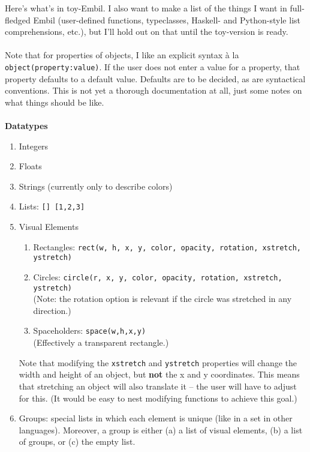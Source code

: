 \documentclass[12pt]{article}
\theoremstyle{remark}
\newcommand{\ttt}[1]{\texttt{#1}}
\begin{document}
\newpage 
\noindent
Here's what's in toy-Embil. I also want to make a list of the things I want in full-fledged Embil (user-defined functions, typeclasses, Haskell- and Python-style list comprehensions, etc.), but I'll hold out on that until the toy-version is ready.
\\\\
Note that for properties of objects, I like an explicit syntax \`a la \ttt{object(property:value)}. If the user does not enter a value for a property, that property defaults to a default value. Defaults are to be decided, as are syntactical conventions. This is not yet a thorough documentation at all, just some notes on what things should be like.
\\\\
\textbf{Datatypes}
\begin{enumerate}
\item Integers
\item Floats
\item Strings (currently only to describe colors)
\item Lists: \ttt{[] [1,2,3]}
\item Visual Elements
\begin{enumerate}
\item Rectangles: \ttt{rect(w, h, x, y, color, opacity, rotation, xstretch, ystretch)}
\item Circles: \ttt{circle(r, x, y, color, opacity, rotation, xstretch, ystretch)}
\\ (Note: the rotation option is relevant if the circle was stretched in any direction.)
\item Spaceholders: \ttt{space(w,h,x,y)}
\\ (Effectively a transparent rectangle.)
\end{enumerate}
Note that modifying the \ttt{xstretch} and \ttt{ystretch} properties will change the width and height of an object, but \textbf{not} the x and y coordinates. This means that stretching an object will also translate it -- the user will have to adjust for this. (It would be easy to nest modifying functions to achieve this goal.)
\item Groups: special lists in which each element is unique (like in a set in other languages). Moreover, a group is either (a) a list of visual elements, (b) a list of groups, or (c) the empty list.
\end{enumerate}
\newpage
\noindent
\end{document}
